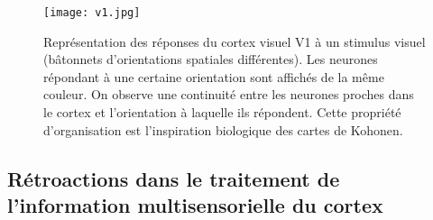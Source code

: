 \documentclass[../main]{subfiles}
\begin{document}
\begin{figure}
\centering
\texttt{[image: v1.jpg]}
\caption{Représentation des réponses du cortex visuel V1 à un stimulus visuel (bâtonnets d'orientations spatiales différentes). Les neurones répondant à une certaine orientation sont affichés de la même couleur. On observe une continuité entre les neurones proches dans le cortex et l'orientation à laquelle ils répondent. Cette propriété d'organisation est l'inspiration biologique des cartes de Kohonen.\label{fig:v1}}

\end{figure}

\subsection{Rétroactions dans le traitement de l'information multisensorielle du cortex}
\end{document}

